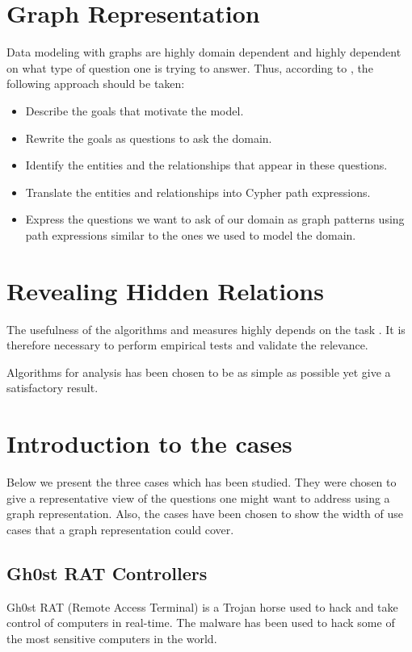\section{Graph Representation}
Data modeling with graphs are highly domain dependent and highly dependent on what type of question one is trying to answer. Thus, according to \citet{robinson2013}, the following approach should be taken:
\begin{itemize}
    \item Describe the goals that motivate the model.
    \item Rewrite the goals as questions to ask the domain.
    \item Identify the entities and the relationships that appear in these questions. 
    \item Translate the entities and relationships into Cypher path expressions.
    \item Express the questions we want to ask of our domain as graph patterns using path expressions similar to the ones we used to model the domain. 
\end{itemize}

\section{Revealing Hidden Relations}

The usefulness of the algorithms and measures highly depends on the task \cite{fouss2016algorithms}. It is therefore necessary to perform empirical tests and validate the relevance. 

Algorithms for analysis has been chosen to be as simple as possible yet give a satisfactory result. 


\section{Introduction to the cases}
Below we present the three cases which has been studied. They were chosen to give a representative view of the questions one might want to address using a graph representation. Also, the cases have been chosen to show the width of use cases that a graph representation could cover.

\subsection{Gh0st RAT Controllers}
Gh0st RAT (Remote Access Terminal) is a Trojan horse used to hack and take control of computers in real-time. The malware has been used to hack some of the most sensitive computers in the world.

